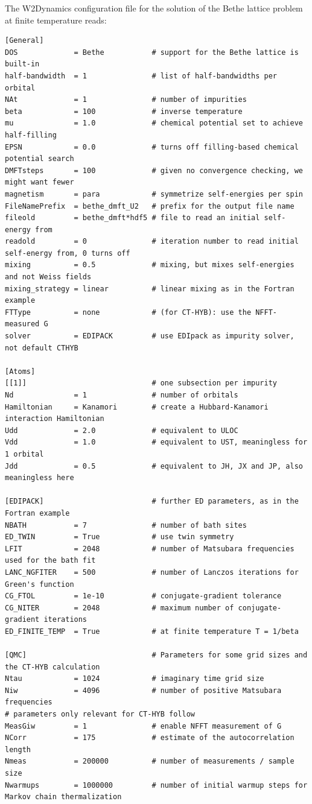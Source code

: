 \documentclass[edipack_sp.tex]{subfiles}
\begin{document}
The W2Dynamics configuration file for the solution of the Bethe lattice problem at finite temperature reads: 
\begin{lstlisting}[style=mybash,language={},numbers=none,basicstyle={\scriptsize\ttfamily}]
[General]
DOS             = Bethe           # support for the Bethe lattice is built-in
half-bandwidth  = 1               # list of half-bandwidths per orbital
NAt             = 1               # number of impurities
beta            = 100             # inverse temperature
mu              = 1.0             # chemical potential set to achieve half-filling
EPSN            = 0.0             # turns off filling-based chemical potential search
DMFTsteps       = 100             # given no convergence checking, we might want fewer
magnetism       = para            # symmetrize self-energies per spin
FileNamePrefix  = bethe_dmft_U2   # prefix for the output file name
fileold         = bethe_dmft*hdf5 # file to read an initial self-energy from
readold         = 0               # iteration number to read initial self-energy from, 0 turns off
mixing          = 0.5             # mixing, but mixes self-energies and not Weiss fields
mixing_strategy = linear          # linear mixing as in the Fortran example
FTType          = none            # (for CT-HYB): use the NFFT-measured G
solver          = EDIPACK         # use EDIpack as impurity solver, not default CTHYB

[Atoms]
[[1]]                             # one subsection per impurity
Nd              = 1               # number of orbitals
Hamiltonian     = Kanamori        # create a Hubbard-Kanamori interaction Hamiltonian
Udd             = 2.0             # equivalent to ULOC
Vdd             = 1.0             # equivalent to UST, meaningless for 1 orbital
Jdd             = 0.5             # equivalent to JH, JX and JP, also meaningless here

[EDIPACK]                         # further ED parameters, as in the Fortran example
NBATH           = 7               # number of bath sites
ED_TWIN         = True            # use twin symmetry
LFIT            = 2048            # number of Matsubara frequencies used for the bath fit
LANC_NGFITER    = 500             # number of Lanczos iterations for Green's function
CG_FTOL         = 1e-10           # conjugate-gradient tolerance
CG_NITER        = 2048            # maximum number of conjugate-gradient iterations
ED_FINITE_TEMP  = True            # at finite temperature T = 1/beta

[QMC]                             # Parameters for some grid sizes and the CT-HYB calculation
Ntau            = 1024            # imaginary time grid size
Niw             = 4096            # number of positive Matsubara frequencies
# parameters only relevant for CT-HYB follow
MeasGiw         = 1               # enable NFFT measurement of G
NCorr           = 175             # estimate of the autocorrelation length
Nmeas           = 200000          # number of measurements / sample size
Nwarmups        = 1000000         # number of initial warmup steps for Markov chain thermalization
\end{lstlisting}
\end{document}
